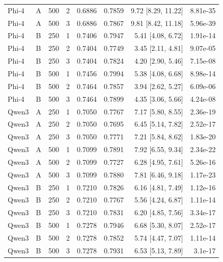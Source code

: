 \begin{longtable}{llrrrrrr}
Phi-4 & A & 500 & 2 & 0.6886 & 0.7859 & 9.72 [8.29, 11.22] & 8.81e-35 \\
Phi-4 & A & 500 & 3 & 0.6886 & 0.7867 & 9.81 [8.42, 11.18] & 5.96e-39 \\
Phi-4 & B & 250 & 1 & 0.7406 & 0.7947 & 5.41 [4.08, 6.72] & 1.91e-14 \\
Phi-4 & B & 250 & 2 & 0.7404 & 0.7749 & 3.45 [2.11, 4.81] & 9.07e-05 \\
Phi-4 & B & 250 & 3 & 0.7404 & 0.7824 & 4.20 [2.90, 5.46] & 7.15e-08 \\
Phi-4 & B & 500 & 1 & 0.7456 & 0.7994 & 5.38 [4.08, 6.68] & 8.98e-14 \\
Phi-4 & B & 500 & 2 & 0.7464 & 0.7857 & 3.94 [2.62, 5.27] & 6.09e-06 \\
Phi-4 & B & 500 & 3 & 0.7464 & 0.7899 & 4.35 [3.06, 5.66] & 4.24e-08 \\
Qwen3 & A & 250 & 1 & 0.7050 & 0.7767 & 7.17 [5.80, 8.55] & 2.36e-19 \\
Qwen3 & A & 250 & 2 & 0.7050 & 0.7695 & 6.45 [5.14, 7.82] & 2.52e-17 \\
Qwen3 & A & 250 & 3 & 0.7050 & 0.7771 & 7.21 [5.84, 8.62] & 1.83e-20 \\
Qwen3 & A & 500 & 1 & 0.7099 & 0.7891 & 7.92 [6.55, 9.34] & 2.34e-22 \\
Qwen3 & A & 500 & 2 & 0.7099 & 0.7727 & 6.28 [4.95, 7.61] & 5.26e-16 \\
Qwen3 & A & 500 & 3 & 0.7099 & 0.7880 & 7.81 [6.46, 9.18] & 1.17e-23 \\
Qwen3 & B & 250 & 1 & 0.7210 & 0.7826 & 6.16 [4.81, 7.49] & 1.12e-16 \\
Qwen3 & B & 250 & 2 & 0.7210 & 0.7767 & 5.56 [4.24, 6.87] & 1.11e-14 \\
Qwen3 & B & 250 & 3 & 0.7210 & 0.7831 & 6.20 [4.85, 7.56] & 3.34e-17 \\
Qwen3 & B & 500 & 1 & 0.7278 & 0.7946 & 6.68 [5.30, 8.07] & 2.52e-17 \\
Qwen3 & B & 500 & 2 & 0.7278 & 0.7852 & 5.74 [4.47, 7.07] & 1.11e-14 \\
Qwen3 & B & 500 & 3 & 0.7278 & 0.7931 & 6.53 [5.13, 7.89] & 3.1e-17 \\
\bottomrule\end{longtable}
